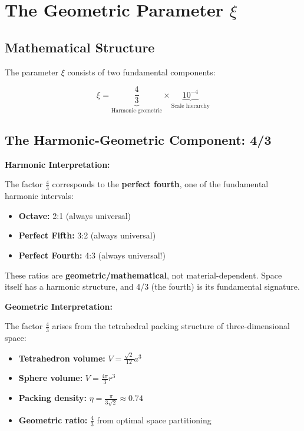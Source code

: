 	\section{The Geometric Parameter $\xi$}
	
	\subsection{Mathematical Structure}
	
	The parameter $\xi$ consists of two fundamental components:
	
	\begin{equation}
		\xi = \underbrace{\frac{4}{3}}_{\text{Harmonic-geometric}} \times \underbrace{10^{-4}}_{\text{Scale hierarchy}}
		\label{eq:xi_components}
	\end{equation}
	
	\subsection{The Harmonic-Geometric Component: 4/3}
	
	\begin{alternative}
		\textbf{Harmonic Interpretation:}
		
		The factor $\frac{4}{3}$ corresponds to the \textbf{perfect fourth}, one of the fundamental harmonic intervals:
		\begin{itemize}
			\item \textbf{Octave:} 2:1 (always universal)
			\item \textbf{Perfect Fifth:} 3:2 (always universal)  
			\item \textbf{Perfect Fourth:} 4:3 (always universal!)
		\end{itemize}
		
		These ratios are \textbf{geometric/mathematical}, not material-dependent. Space itself has a harmonic structure, and 4/3 (the fourth) is its fundamental signature.
	\end{alternative}
	
	\begin{alternative}
		\textbf{Geometric Interpretation:}
		
		The factor $\frac{4}{3}$ arises from the tetrahedral packing structure of three-dimensional space:
		\begin{itemize}
			\item \textbf{Tetrahedron volume:} $V = \frac{\sqrt{2}}{12}a^3$
			\item \textbf{Sphere volume:} $V = \frac{4\pi}{3}r^3$ 
			\item \textbf{Packing density:} $\eta = \frac{\pi}{3\sqrt{2}} \approx 0.74$
			\item \textbf{Geometric ratio:} $\frac{4}{3}$ from optimal space partitioning
		\end{itemize}
	\end{alternative}
	
